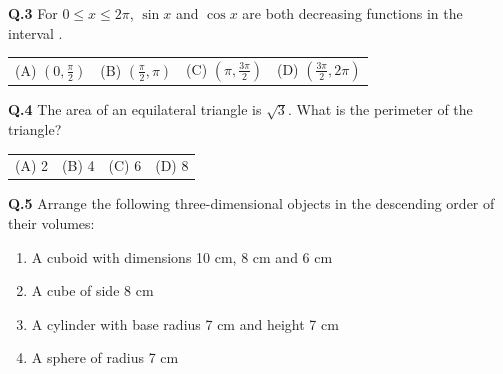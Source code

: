 \documentclass{article}
\begin{document}
\vspace{01cm}


\textbf{Q.3}  \hspace{0.2cm }\quad For \( 0 \leq x \leq 2\pi \), \( \sin x \) and \( \cos x \) are both decreasing functions in the interval \underline{\hspace{1cm}}.

\vspace{0.5cm}

\begin{tabular}{llll} 
\hspace{1.2cm}(A) \( \left( 0, \frac{\pi}{2} \right) \) & 
\hspace{0.5cm}(B) \( \left( \frac{\pi}{2}, \pi \right) \) & 
\hspace{0.5cm}(C) \( \left( \pi, \frac{3\pi}{2} \right) \) & 
\hspace{0.5cm}(D) \( \left( \frac{3\pi}{2}, 2\pi \right) \) \\
\end{tabular} 

\vspace{0.8cm}

\textbf{Q.4} \quad The area of an equilateral triangle is \( \sqrt{3} \). What is the perimeter of the triangle?

\vspace{0.5cm}

\begin{tabular}{llll}
\hspace{1.2cm}(A) 2 &\hspace{1.8cm}(B) 4 & \hspace{1.2cm}(C) 6 &\hspace{1.2cm} (D) 8 \\
\end{tabular}

\vspace{0.5cm}


\textbf{Q.5} \quad Arrange the following three-dimensional objects in the descending order of their volumes:


\begin{enumerate}[label=(\roman*), leftmargin=2.4 cm  ]
    \item A cuboid with dimensions 10 cm, 8 cm and 6 cm
    \item A cube of side 8 cm
    \item A cylinder with base radius 7 cm and height 7 cm
    \item A sphere of radius 7 cm
\end{enumerate}
\end{document}
